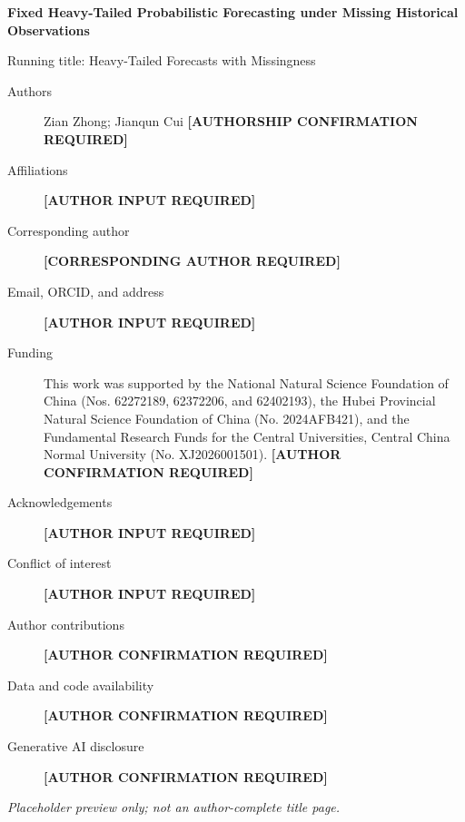 \documentclass[11pt]{article}
\begin{document}
\begin{center}
{\Large\bfseries Fixed Heavy-Tailed Probabilistic Forecasting under Missing Historical Observations\par}
\vspace{0.5em}
{\small Running title: Heavy-Tailed Forecasts with Missingness\par}
\end{center}
\begin{description}
\item[Authors] Zian Zhong; Jianqun Cui \textbf{[AUTHORSHIP CONFIRMATION REQUIRED]}
\item[Affiliations] \textbf{[AUTHOR INPUT REQUIRED]}
\item[Corresponding author] \textbf{[CORRESPONDING AUTHOR REQUIRED]}
\item[Email, ORCID, and address] \textbf{[AUTHOR INPUT REQUIRED]}
\item[Funding] This work was supported by the National Natural Science Foundation of China (Nos. 62272189, 62372206, and 62402193), the Hubei Provincial Natural Science Foundation of China (No. 2024AFB421), and the Fundamental Research Funds for the Central Universities, Central China Normal University (No. XJ2026001501). \textbf{[AUTHOR CONFIRMATION REQUIRED]}
\item[Acknowledgements] \textbf{[AUTHOR INPUT REQUIRED]}
\item[Conflict of interest] \textbf{[AUTHOR INPUT REQUIRED]}
\item[Author contributions] \textbf{[AUTHOR CONFIRMATION REQUIRED]}
\item[Data and code availability] \textbf{[AUTHOR CONFIRMATION REQUIRED]}
\item[Generative AI disclosure] \textbf{[AUTHOR CONFIRMATION REQUIRED]}
\end{description}
\vfill
\noindent\textit{Placeholder preview only; not an author-complete title page.}
\end{document}
